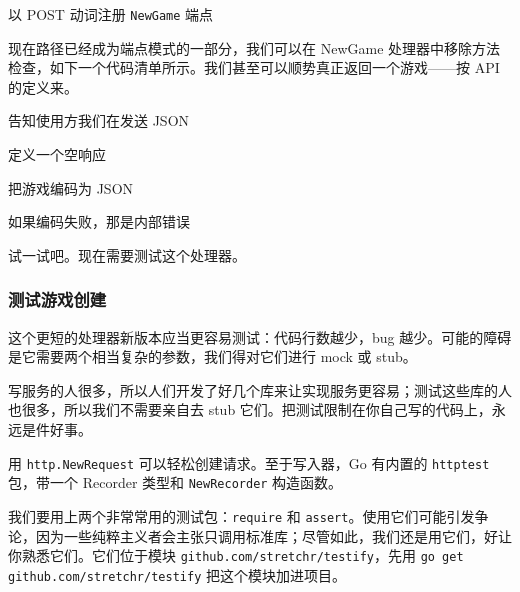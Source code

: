 \begin{codeannotations}
\item 以 POST 动词注册 \texttt{NewGame} 端点
\end{codeannotations}

现在路径已经成为端点模式的一部分，我们可以在 NewGame 处理器中移除方法检查，如下一个代码清单所示。我们甚至可以顺势真正返回一个游戏——按 API 的定义来。


\begin{codeannotations}
\item 告知使用方我们在发送 JSON
\item 定义一个空响应
\item 把游戏编码为 JSON
\item 如果编码失败，那是内部错误
\end{codeannotations}

试一试吧。现在需要测试这个处理器。

\subsubsection*{测试游戏创建}

这个更短的处理器新版本应当更容易测试：代码行数越少，bug 越少。可能的障碍是它需要两个相当复杂的参数，我们得对它们进行 mock 或 stub。

写服务的人很多，所以人们开发了好几个库来让实现服务更容易；测试这些库的人也很多，所以我们不需要亲自去 stub 它们。把测试限制在你自己写的代码上，永远是件好事。

用 \texttt{http.NewRequest} 可以轻松创建请求。至于写入器，Go 有内置的 \texttt{httptest} 包，带一个 Recorder 类型和 \texttt{NewRecorder} 构造函数。

我们要用上两个非常常用的测试包：\texttt{require} 和 \texttt{assert}。使用它们可能引发争论，因为一些纯粹主义者会主张只调用标准库；尽管如此，我们还是用它们，好让你熟悉它们。它们位于模块 \texttt{github.com/stretchr/testify}，先用 \texttt{go get github.com/stretchr/testify} 把这个模块加进项目。


